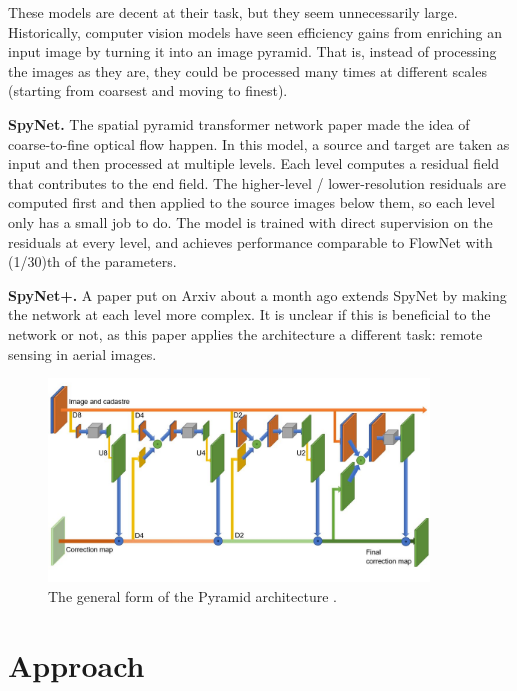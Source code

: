 \documentclass[12pt,a4paper]{article}
\begin{document}
These models are decent at their task, but they seem unnecessarily large.  Historically, computer vision models have seen efficiency gains from enriching an input image by turning it into an image pyramid. That is, instead of processing the images as they are, they could be processed many times at different scales (starting from coarsest and moving to finest).

{\bf SpyNet.} The spatial pyramid transformer network paper \cite{spynet} made the idea of coarse-to-fine optical flow happen. In this model, a source and target are taken as input and then processed at multiple levels. Each level computes a residual field that contributes to the end field. The higher-level / lower-resolution residuals are computed first and then applied to the source images below them, so each level only has a small job to do. The model is trained with direct supervision on the residuals at every level, and achieves performance comparable to FlowNet with (1/30)th of the parameters. 

{\bf SpyNet+.} A paper \cite{spynet_plus} put on Arxiv about a month ago extends SpyNet by making the network at each level more complex. It is unclear if this is beneficial to the network or not, as this paper applies the architecture a different task: remote sensing in aerial images. 

\begin{figure}[h!]
\centering
\includegraphics[width=0.9\textwidth]{py_net.jpg}
\caption{\label{fig:pynet}The general form of the Pyramid architecture \cite{spynet_plus}.}
\end{figure}

\newpage



\section{Approach}
\end{document}
